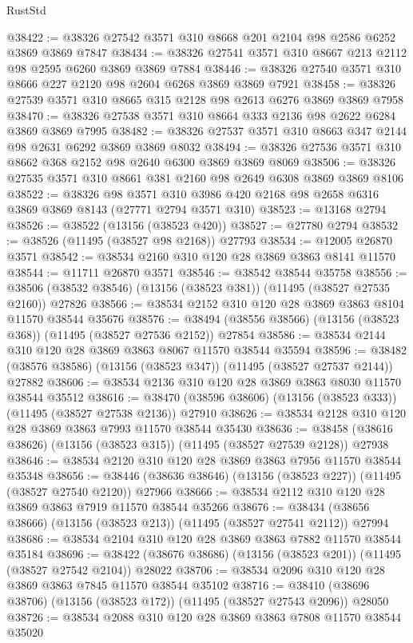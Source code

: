 \begin{lexlean}{RustStd}
\begin{coremodule}
@38422 := @38326 @27542 @3571 @310 @8668 @201 @2104 @98 @2586 @6252 @3869 @3869 @7847
@38434 := @38326 @27541 @3571 @310 @8667 @213 @2112 @98 @2595 @6260 @3869 @3869 @7884
@38446 := @38326 @27540 @3571 @310 @8666 @227 @2120 @98 @2604 @6268 @3869 @3869 @7921
@38458 := @38326 @27539 @3571 @310 @8665 @315 @2128 @98 @2613 @6276 @3869 @3869 @7958
@38470 := @38326 @27538 @3571 @310 @8664 @333 @2136 @98 @2622 @6284 @3869 @3869 @7995
@38482 := @38326 @27537 @3571 @310 @8663 @347 @2144 @98 @2631 @6292 @3869 @3869 @8032
@38494 := @38326 @27536 @3571 @310 @8662 @368 @2152 @98 @2640 @6300 @3869 @3869 @8069
@38506 := @38326 @27535 @3571 @310 @8661 @381 @2160 @98 @2649 @6308 @3869 @3869 @8106
@38522 := @38326
    @98
    @3571
    @310
    @3986
    @420
    @2168
    @98
    @2658
    @6316
    @3869
    @3869
    @8143
    (@27771 @2794 @3571 @310)
@38523 := @13168 @2794
@38526 := @38522 (@13156 (@38523 @420))
@38527 := @27780 @2794
@38532 := @38526 (@11495 (@38527 @98 @2168)) @27793
@38534 := @12005 @26870 @3571
@38542 := @38534 @2160 @310 @120 @28 @3869 @3863 @8141 @11570
@38544 := @11711 @26870 @3571
@38546 := @38542 @38544 @35758
@38556 := @38506 (@38532 @38546) (@13156 (@38523 @381)) (@11495 (@38527 @27535 @2160)) @27826
@38566 := @38534 @2152 @310 @120 @28 @3869 @3863 @8104 @11570 @38544 @35676
@38576 := @38494 (@38556 @38566) (@13156 (@38523 @368)) (@11495 (@38527 @27536 @2152)) @27854
@38586 := @38534 @2144 @310 @120 @28 @3869 @3863 @8067 @11570 @38544 @35594
@38596 := @38482 (@38576 @38586) (@13156 (@38523 @347)) (@11495 (@38527 @27537 @2144)) @27882
@38606 := @38534 @2136 @310 @120 @28 @3869 @3863 @8030 @11570 @38544 @35512
@38616 := @38470 (@38596 @38606) (@13156 (@38523 @333)) (@11495 (@38527 @27538 @2136)) @27910
@38626 := @38534 @2128 @310 @120 @28 @3869 @3863 @7993 @11570 @38544 @35430
@38636 := @38458 (@38616 @38626) (@13156 (@38523 @315)) (@11495 (@38527 @27539 @2128)) @27938
@38646 := @38534 @2120 @310 @120 @28 @3869 @3863 @7956 @11570 @38544 @35348
@38656 := @38446 (@38636 @38646) (@13156 (@38523 @227)) (@11495 (@38527 @27540 @2120)) @27966
@38666 := @38534 @2112 @310 @120 @28 @3869 @3863 @7919 @11570 @38544 @35266
@38676 := @38434 (@38656 @38666) (@13156 (@38523 @213)) (@11495 (@38527 @27541 @2112)) @27994
@38686 := @38534 @2104 @310 @120 @28 @3869 @3863 @7882 @11570 @38544 @35184
@38696 := @38422 (@38676 @38686) (@13156 (@38523 @201)) (@11495 (@38527 @27542 @2104)) @28022
@38706 := @38534 @2096 @310 @120 @28 @3869 @3863 @7845 @11570 @38544 @35102
@38716 := @38410 (@38696 @38706) (@13156 (@38523 @172)) (@11495 (@38527 @27543 @2096)) @28050
@38726 := @38534 @2088 @310 @120 @28 @3869 @3863 @7808 @11570 @38544 @35020

\end{coremodule}
\end{lexlean}
